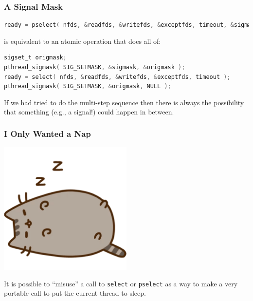 \begin{frame}[fragile]
\frametitle{A Signal Mask}

\begin{lstlisting}[language=C]
ready = pselect( nfds, &readfds, &writefds, &exceptfds, timeout, &sigmask );
\end{lstlisting}

is equivalent to an atomic operation that does all of:

\begin{lstlisting}[language=C]
sigset_t origmask;
pthread_sigmask( SIG_SETMASK, &sigmask, &origmask );
ready = select( nfds, &readfds, &writefds, &exceptfds, timeout );
pthread_sigmask( SIG_SETMASK, &origmask, NULL );
\end{lstlisting}

If we had tried to do the multi-step sequence then there is always the possibility that something (e.g., a signal!) could happen in between.

\end{frame}


\begin{frame}
\frametitle{I Only Wanted a Nap}

\begin{center}
	\includegraphics[width=0.5\textwidth]{images/pusheen-nap.png}
\end{center}

It is possible to ``misuse'' a call to \texttt{select} or \texttt{pselect} as a way to make a very portable call to put the current thread to sleep.

\end{frame}


